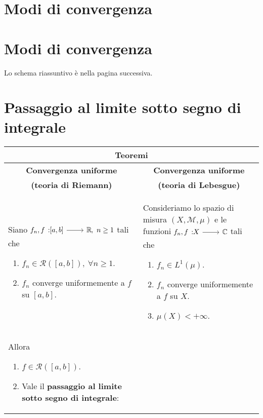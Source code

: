 \section{Modi di convergenza}
\section{Modi di convergenza}
Lo schema riassuntivo è nella pagina successiva.
	
\newpage
\section{Passaggio al limite sotto segno di integrale}
\begin{center}
	\begin{tabular}{p{}p{}}
		\multicolumn{2}{c}{\textbf{Teoremi}} \\\hline
		\multicolumn{1}{c|}{
			 \textbf{Convergenza uniforme}} & \multicolumn{1}{c}{\textbf{Convergenza uniforme}}\\
		\multicolumn{1}{c|}{\textbf{(teoria di Riemann)}} &
			\multicolumn{1}{c}{\textbf{(teoria di Lebesgue)}} \\
		\multicolumn{1}{p{0.49\textwidth}|}{Siano $\funz{f_n,f}{\left[a,b\right]}{\realset},\ n\geq 1$ tali che
		\begin{enumerate}[label=(\alph*)]
			\item $f_n\in\mathcal{R}\left(\left[a,b\right]\right),\ \forall n\geq 1$.
			\item $f_n$ converge uniformemente a $f$ su $\left[a,b\right]$.
		\end{enumerate}
		} &
		Consideriamo lo spazio di misura $\left(X,\mathcal{M},\mu\right)$ e le funzioni $\funz{f_n,f}{X}{\complexset}$ tali che
		\begin{enumerate}[label=(\alph*)]
			\item $f_n\in L^{1}\left(\mu\right)$.
			\item $f_n$ converge uniformemente a $f$ su $X$.
			\item $\mu(X)<+\infty$.
		\end{enumerate}\\[-4mm]
		\multicolumn{1}{p{0.49\textwidth}|}{Allora
		\begin{enumerate}
			\item $f\in\mathcal{R}\left(\left[a,b\right]\right)$.
			\item Vale il \textbf{passaggio al limite sotto segno di integrale}:\newline

\end{enumerate}}
\end{tabular}
\end{center}
